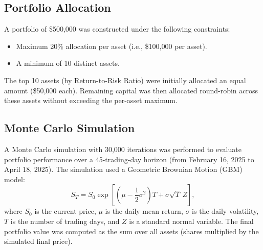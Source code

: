 \documentclass[11pt]{article}
\begin{document}
\subsection{Portfolio Allocation}
A portfolio of \$500,000 was constructed under the following constraints:
\begin{itemize}
    \item Maximum 20\% allocation per asset (i.e., \$100,000 per asset).
    \item A minimum of 10 distinct assets.
\end{itemize}
The top 10 assets (by Return-to-Risk Ratio) were initially allocated an equal amount (\$50,000 each). Remaining capital was then allocated round-robin across these assets without exceeding the per-asset maximum.

\subsection{Monte Carlo Simulation}
A Monte Carlo simulation with 30,000 iterations was performed to evaluate portfolio performance over a 45-trading-day horizon (from February 16, 2025 to April 18, 2025). The simulation used a Geometric Brownian Motion (GBM) model:
\[
S_T = S_0 \exp\left[\left(\mu - \frac{1}{2}\sigma^2\right)T + \sigma \sqrt{T}\, Z\right],
\]
where $S_0$ is the current price, $\mu$ is the daily mean return, $\sigma$ is the daily volatility, $T$ is the number of trading days, and $Z$ is a standard normal variable. The final portfolio value was computed as the sum over all assets (shares multiplied by the simulated final price).
\end{document}

